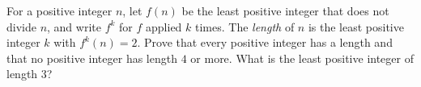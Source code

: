 For a positive integer $n$, let $f(n)$ be the least positive integer that does not divide $n$, and write $f^k$ for $f$ applied $k$ times. The \emph{length} of $n$ is the least positive integer $k$ with $f^k(n)=2$. Prove that every positive integer has a length and that no positive integer has length $4$ or more. What is the least positive integer of length $3$?
